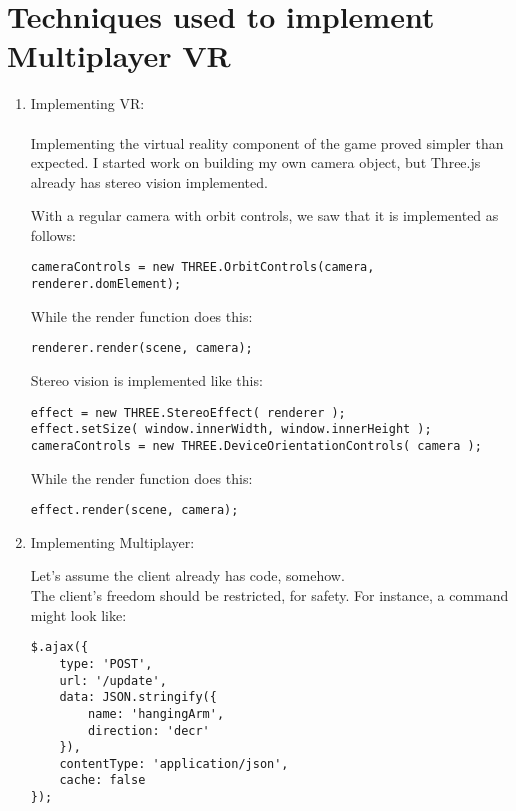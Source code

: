 \documentclass{article}
\begin{document}

\section{Techniques used to implement Multiplayer VR}

\begin{enumerate}
 	\item Implementing VR: \\ \\
 		Implementing the virtual reality component of the game proved simpler than expected.  I started work on building my own camera object, but Three.js already has stereo vision implemented.

		With a regular camera with orbit controls, we saw that it is implemented as follows:
 		\begin{lstlisting}
cameraControls = new THREE.OrbitControls(camera, renderer.domElement);
 		\end{lstlisting}
 		
 		While the render function does this:
 		\begin{lstlisting}
renderer.render(scene, camera);
 		\end{lstlisting}
 		
 		Stereo vision is implemented like this:
 		\begin{lstlisting}
effect = new THREE.StereoEffect( renderer );
effect.setSize( window.innerWidth, window.innerHeight );
cameraControls = new THREE.DeviceOrientationControls( camera );
 		\end{lstlisting}
 		
 		While the render function does this:
 		\begin{lstlisting}
effect.render(scene, camera);
 		\end{lstlisting}
 	\item Implementing Multiplayer:
 	
 		Let's assume the client already has code, somehow. \\
 		
 		The client's freedom should be restricted, for safety.  For instance, a command might look like:

		\begin{lstlisting}
$.ajax({
	type: 'POST',
	url: '/update',
	data: JSON.stringify({
		name: 'hangingArm',
		direction: 'decr'
	}),
	contentType: 'application/json',
	cache: false
});
 		\end{lstlisting}

		
\end{enumerate} \clearpage
\end{document}
